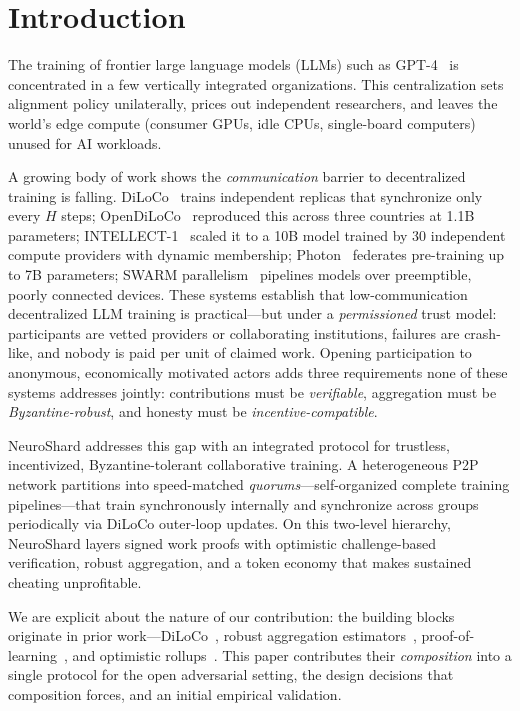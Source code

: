 \documentclass[conference]{IEEEtran}
\begin{document}
\section{Introduction}

The training of frontier large language models (LLMs) such as GPT-4~\cite{openai2023gpt4} is concentrated in a few vertically integrated organizations. This centralization sets alignment policy unilaterally, prices out independent researchers, and leaves the world's edge compute (consumer GPUs, idle CPUs, single-board computers) unused for AI workloads.

A growing body of work shows the \emph{communication} barrier to decentralized training is falling. DiLoCo~\cite{douillard2023diloco} trains independent replicas that synchronize only every $H$ steps; OpenDiLoCo~\cite{jaghouar2024opendiloco} reproduced this across three countries at 1.1B parameters; INTELLECT-1~\cite{jaghouar2024intellect} scaled it to a 10B model trained by 30 independent compute providers with dynamic membership; Photon~\cite{sani2024photon} federates pre-training up to 7B parameters; SWARM parallelism~\cite{ryabinin2023swarm} pipelines models over preemptible, poorly connected devices. These systems establish that low-communication decentralized LLM training is practical---but under a \emph{permissioned} trust model: participants are vetted providers or collaborating institutions, failures are crash-like, and nobody is paid per unit of claimed work. Opening participation to anonymous, economically motivated actors adds three requirements none of these systems addresses jointly: contributions must be \emph{verifiable}, aggregation must be \emph{Byzantine-robust}, and honesty must be \emph{incentive-compatible}.

NeuroShard addresses this gap with an integrated protocol for trustless, incentivized, Byzantine-tolerant collaborative training. A heterogeneous P2P network partitions into speed-matched \emph{quorums}---self-organized complete training pipelines---that train synchronously internally and synchronize across groups periodically via DiLoCo outer-loop updates. On this two-level hierarchy, NeuroShard layers signed work proofs with optimistic challenge-based verification, robust aggregation, and a token economy that makes sustained cheating unprofitable.

We are explicit about the nature of our contribution: the building blocks originate in prior work---DiLoCo~\cite{douillard2023diloco}, robust aggregation estimators~\cite{yin2018byzantine,blanchard2017machine}, proof-of-learning~\cite{jia2021proof}, and optimistic rollups~\cite{kalodner2018arbitrum}. This paper contributes their \emph{composition} into a single protocol for the open adversarial setting, the design decisions that composition forces, and an initial empirical validation.
\end{document}
